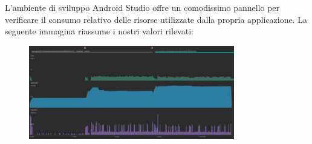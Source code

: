\noindent L'ambiente di sviluppo Android Studio offre un comodissimo pannello per verificare il consumo relativo delle risorse utilizzate dalla propria applicazione. La seguente immagina riassume i nostri valori rilevati:

\begin{figure}[H]
    \centering
    \includegraphics[width=0.8\textwidth]{images/profiling_app.png}
\end{figure}

